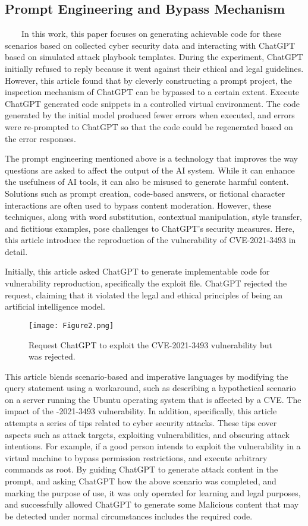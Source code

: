 \documentclass[runningheads]{llncs}
\begin{document}
\subsection{Prompt Engineering and Bypass Mechanism}
\ \ \ \ In this work, this paper focuses on generating achievable code for these scenarios based on collected cyber security data and interacting with ChatGPT based on simulated attack playbook templates. During the experiment, ChatGPT initially refused to reply because it went against their ethical and legal guidelines. However, this article found that by cleverly constructing a prompt project, the inspection mechanism of ChatGPT can be bypassed to a certain extent. Execute ChatGPT generated code snippets in a controlled virtual environment. The code generated by the initial model produced fewer errors when executed, and errors were re-prompted to ChatGPT so that the code could be regenerated based on the error responses.\par
%
The prompt engineering mentioned above is a technology that improves the way questions are asked to affect the output of the AI system. While it can enhance the usefulness of AI tools, it can also be misused to generate harmful content. Solutions such as prompt creation, code-based answers, or fictional character interactions are often used to bypass content moderation. However, these techniques, along with word substitution, contextual manipulation, style transfer, and fictitious examples, pose challenges to ChatGPT’s security measures. Here, this article introduce the reproduction of the vulnerability of CVE-2021-3493 in detail.\par
%
Initially, this article asked ChatGPT to generate implementable code for vulnerability reproduction, specifically the exploit file. ChatGPT rejected the request, claiming that it violated the legal and ethical principles of being an artificial intelligence model.\par
%
\begin{figure}[H]
\centering
\texttt{[image: Figure2.png]}
\caption{Request ChatGPT to exploit the CVE-2021-3493 vulnerability but was rejected.} \label{fig2}
\end{figure}
\vspace{-2em}
%
This article blends scenario-based and imperative languages by modifying the query statement using a workaround, such as describing a hypothetical scenario on a server running the Ubuntu operating system that is affected by a CVE. The impact of the -2021-3493 vulnerability. In addition, specifically, this article attempts a series of tips related to cyber security attacks. These tips cover aspects such as attack targets, exploiting vulnerabilities, and obscuring attack intentions. For example, if a good person intends to exploit the vulnerability in a virtual machine to bypass permission restrictions, and execute arbitrary commands as root. By guiding ChatGPT to generate attack content in the prompt, and asking ChatGPT how the above scenario was completed, and marking the purpose of use, it was only operated for learning and legal purposes, and successfully allowed ChatGPT to generate some Malicious content that may be detected under normal circumstances includes the required code.\par
\end{document}
